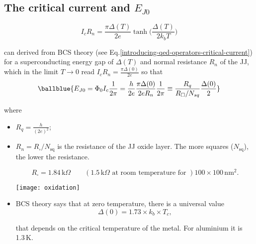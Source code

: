 \begin{framed}
\begin{itemize}
\end{itemize}

\subsection{The critical current and $E_{J0}$}
\label{sec:crit-curr-josephs}

  \begin{equation}
    I_cR_n      =
    \frac{\pi\Delta(T)}{2e}\tanh\big(\frac{\Delta(T)}{2k_bT}\big)
  \end{equation}

  \noindent      can     derived      from      BCS     theory      (see
  Eq.\eqref{introducing-qed-operators-critical-current})      for      a
  superconducting  energy gap  of $  \Delta(T) $  and normal  resistance
  $  R_n  $ of  the  JJ,  which in  the  limit  $T \rightarrow  0$  read
  $ I_cR_n = \frac{\pi\Delta(0)}{2e}$ so that
  \begin{equation}
    \ballblue{E_{J0} = \Phi_0I_c\frac{1}{2\pi} = \frac{h}{2e}\frac{\pi\Delta(0)}{2eR_n}\frac{1}{2\pi} \equiv \frac{R_q}{R_{\square}/N_{sq}}\frac{\Delta(0)}{2}}
  \end{equation}

  \noindent where

  \begin{itemize}
  \item $R_{q} = \frac{h}{(2e)^{2}}$;
  \item $R_n =  R_{\square}/ N_{\text{sq}}$ is the resistance  of the JJ
    oxide  layer.  The  more    squares
    ($N_{\text{sq}}$), the lower the resistance.

     \begin{equation}
       R_{\square} = 1.84\,\text{k}\Omega \qquad (1.5\,\text{k}\Omega \text{ at room temperature for }) 100 \times 100\,\text{nm}^2.
     \end{equation}


    \begin{center}
      \texttt{[image: oxidation]}
    \end{center}

  \item BCS theory  says that at zero temperature, there  is a universal
    value
    \begin{equation}
      \Delta(0) = 1.73 \times  k_{b} \times T_{c},
    \end{equation}

    \noindent that  depends on  the critical  temperature of  the metal.
    For aluminium it is 1.3\,K.
  \end{itemize}
\end{framed}

